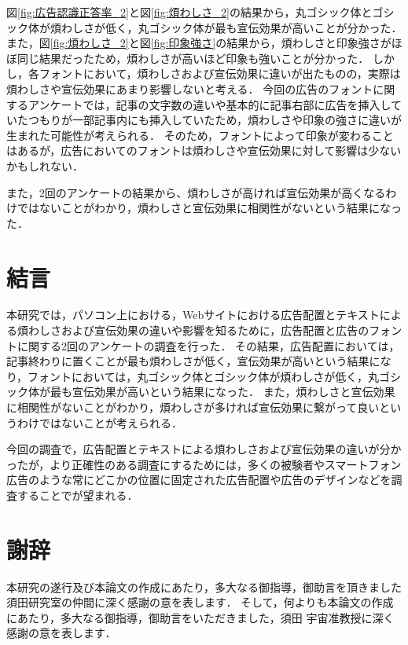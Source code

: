 \documentclass[12pt,a4j,titlepage]{ltjsarticle}
\begin{document}
図\ref{fig:広告認識正答率_2}と図\ref{fig:煩わしさ_2}の結果から，丸ゴシック体とゴシック体が煩わしさが低く，丸ゴシック体が最も宣伝効果が高いことが分かった．
また，図\ref{fig:煩わしさ_2}と図\ref{fig:印象強さ}の結果から，煩わしさと印象強さがほぼ同じ結果だったため，煩わしさが高いほど印象も強いことが分かった．
しかし，各フォントにおいて，煩わしさおよび宣伝効果に違いが出たものの，実際は煩わしさや宣伝効果にあまり影響しないと考える．
今回の広告のフォントに関するアンケートでは，記事の文字数の違いや基本的に記事右部に広告を挿入していたつもりが一部記事内にも挿入していたため，煩わしさや印象の強さに違いが生まれた可能性が考えられる．
そのため，フォントによって印象が変わることはあるが，広告においてのフォントは煩わしさや宣伝効果に対して影響は少ないかもしれない．

また，2回のアンケートの結果から、煩わしさが高ければ宣伝効果が高くなるわけではないことがわかり，煩わしさと宣伝効果に相関性がないという結果になった．

\clearpage

\section{結言}
本研究では，パソコン上における，Webサイトにおける広告配置とテキストによる煩わしさおよび宣伝効果の違いや影響を知るために，広告配置と広告のフォントに関する2回のアンケートの調査を行った．
その結果，広告配置においては，記事終わりに置くことが最も煩わしさが低く，宣伝効果が高いという結果になり，フォントにおいては，丸ゴシック体とゴシック体が煩わしさが低く，丸ゴシック体が最も宣伝効果が高いという結果になった．
また，煩わしさと宣伝効果に相関性がないことがわかり，煩わしさが多ければ宣伝効果に繋がって良いというわけではないことが考えられる．

今回の調査で，広告配置とテキストによる煩わしさおよび宣伝効果の違いが分かったが，より正確性のある調査にするためには，多くの被験者やスマートフォン広告のような常にどこかの位置に固定された広告配置や広告のデザインなどを調査することでが望まれる．

\clearpage

\section{謝辞}
本研究の遂行及び本論文の作成にあたり，多大なる御指導，御助言を頂きました須田研究室の仲間に深く感謝の意を表します．
そして，何よりも本論文の作成にあたり，多大なる御指導，御助言をいただきました，須田 宇宙准教授に深く感謝の意を表します．

\clearpage
\end{document}
